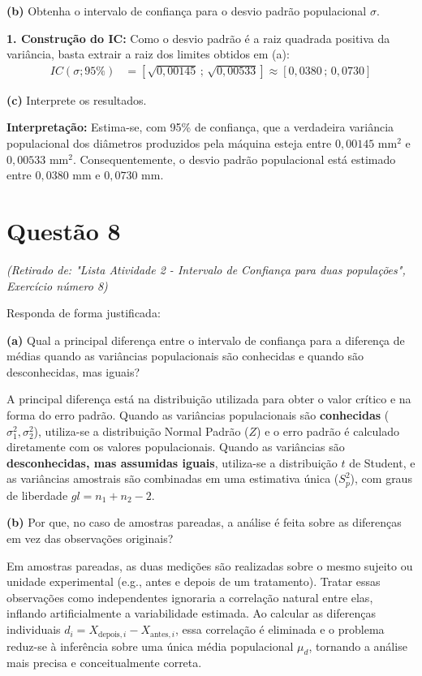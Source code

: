 \documentclass[12pt, a4paper]{article}
\begin{document}
\medskip\noindent\textbf{(b)} Obtenha o intervalo de confiança para o desvio padrão populacional $\sigma$.

\noindent \textbf{1. Construção do IC:} Como o desvio padrão é a raiz quadrada positiva da variância, basta extrair a raiz dos limites obtidos em (a):
\begin{align*}
IC(\sigma; 95\%) &= \left[ \sqrt{0{,}00145} \,;\, \sqrt{0{,}00533} \right] \approx \boxed{[0{,}0380 \,;\, 0{,}0730]}
\end{align*}

\medskip\noindent\textbf{(c)} Interprete os resultados.

\noindent \textbf{Interpretação:} Estima-se, com 95\% de confiança, que a verdadeira variância populacional dos diâmetros produzidos pela máquina esteja entre $0{,}00145 \text{ mm}^2$ e $0{,}00533 \text{ mm}^2$. Consequentemente, o desvio padrão populacional está estimado entre $0{,}0380 \text{ mm}$ e $0{,}0730 \text{ mm}$.
\section*{Questão 8}
\textit{(Retirado de: "Lista Atividade 2 - Intervalo de Confiança para duas populações", Exercício número 8)}

Responda de forma justificada:

\medskip\noindent\textbf{(a)} Qual a principal diferença entre o intervalo de confiança para a diferença de médias quando as variâncias populacionais são conhecidas e quando são desconhecidas, mas iguais?

\noindent A principal diferença está na distribuição utilizada para obter o valor crítico e na forma do erro padrão. Quando as variâncias populacionais são \textbf{conhecidas} ($\sigma^2_1, \sigma^2_2$), utiliza-se a distribuição Normal Padrão ($Z$) e o erro padrão é calculado diretamente com os valores populacionais. Quando as variâncias são \textbf{desconhecidas, mas assumidas iguais}, utiliza-se a distribuição $t$ de Student, e as variâncias amostrais são combinadas em uma estimativa única ($S^2_p$), com graus de liberdade $gl = n_1 + n_2 - 2$.

\medskip\noindent\textbf{(b)} Por que, no caso de amostras pareadas, a análise é feita sobre as diferenças em vez das observações originais?

\noindent Em amostras pareadas, as duas medições são realizadas sobre o mesmo sujeito ou unidade experimental (e.g., antes e depois de um tratamento). Tratar essas observações como independentes ignoraria a correlação natural entre elas, inflando artificialmente a variabilidade estimada. Ao calcular as diferenças individuais $d_i = X_{\text{depois},i} - X_{\text{antes},i}$, essa correlação é eliminada e o problema reduz-se à inferência sobre uma única média populacional $\mu_d$, tornando a análise mais precisa e conceitualmente correta.
\end{document}
